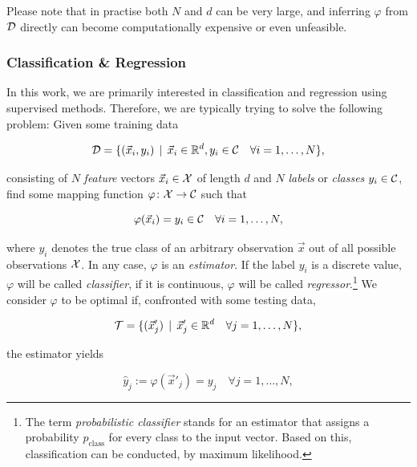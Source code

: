 Please note that in practise both $N$ and $d$ can be very large, and inferring $\varphi$ from $\mathcal{D}$ directly can become computationally expensive or even unfeasible.

\subsubsection{Classification \& Regression}

In this work, we are primarily interested in classification and regression using supervised methods. Therefore, we are typically trying to solve the following problem: Given some training data

\begin{equation}
\mathcal{D} = \{ (\vec x_i, y_i) \, \mid \, \vec x_i \in \mathbb{R}^d, y_i \in \mathcal{C} \quad \forall i = 1,\ldots,N \},
\end{equation}

consisting of $N$ \emph{feature} vectors $\vec x_i \in \mathcal{X}$ of length $d$ and $N$ \emph{labels} or \emph{classes} $y_i \in \mathcal{C}$, find some mapping function $\varphi \colon \mathcal{X} \to \mathcal{C}$ such that

\begin{equation}
\varphi(\vec x_i) = y_i \in \mathcal{C} \quad \forall i = 1,\ldots,N,
\end{equation}

where $y_i$ denotes the true class of an arbitrary observation $\vec x$ out of all possible observations $\mathcal{X}$. In any case, $\varphi$ is an \emph{estimator}. If the label $y_i$ is a discrete value, $\varphi$ will be called \emph{classifier}, if it is continuous, $\varphi$ will be called \emph{regressor}.\footnote{The term \emph{probabilistic classifier} stands for an estimator that assigns a probability $p_{\text{class}}$ for every class to the input vector. Based on this, classification can be conducted, \eg by maximum likelihood.} We consider $\varphi$ to be optimal if, confronted with some testing data,

\begin{equation}
\mathcal{T} = \{ (\vec x'_j) \, \mid \, \vec x'_j \in \mathbb{R}^d \quad \forall j = 1,\ldots,N \},
\end{equation}

the estimator yields

\begin{equation}
\hat y_j := \varphi({\vec x'_j}) = y_j \quad \forall j = 1,\ldots,N,
\end{equation}

